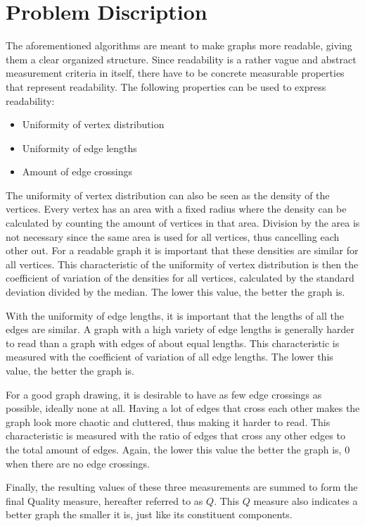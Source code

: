 \documentclass[a4paper,12pt]{article}
\begin{document}
  \section{Problem Discription}
    The aforementioned algorithms are meant to make graphs more readable, giving them a clear organized structure.
    Since readability is a rather vague and abstract measurement criteria in itself, there have to be concrete measurable properties that represent readability.
    The following properties can be used to express readability: \cite{kobourov2012spring}
    \begin{itemize}
      \item Uniformity of vertex distribution
      \item Uniformity of edge lengths
      \item Amount of edge crossings
    \end{itemize}
    The uniformity of vertex distribution can also be seen as the density of the vertices.
    Every vertex has an area with a fixed radius where the density can be calculated by counting the amount of vertices in that area. Division by the area is not necessary since the same area is used for all vertices, thus cancelling each other out.
    For a readable graph it is important that these densities are similar for all vertices.
    This characteristic of the uniformity of vertex distribution is then the coefficient of variation of the densities for all vertices, calculated by the standard deviation divided by the median. The lower this value, the better the graph is.

    With the uniformity of edge lengths, it is important that the lengths of all the edges are similar.
    A graph with a high variety of edge lengths is generally harder to read than a graph with edges of about equal lengths.
    This characteristic is measured with the coefficient of variation of all edge lengths. The lower this value, the better the graph is.

    For a good graph drawing, it is desirable to have as few edge crossings as possible, ideally none at all.
    Having a lot of edges that cross each other makes the graph look more chaotic and cluttered, thus making it harder to read. This characteristic is measured with the ratio of edges that cross any other edges to the total amount of edges. Again, the lower this value the better the graph is, $0$ when there are no edge crossings.

	Finally, the resulting values of these three measurements are summed to form the final Quality measure, hereafter referred to as $Q$. This $Q$ measure also indicates a better graph the smaller it is, just like its constituent components.
\end{document}

